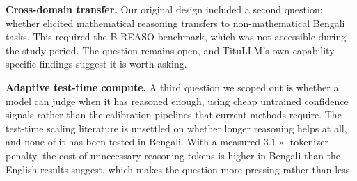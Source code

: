 \textbf{Cross-domain transfer.} Our original design included a second question:
whether elicited mathematical reasoning transfers to non-mathematical Bengali
tasks. This required the B-REASO benchmark, which was not accessible during the
study period. The question remains open, and TituLLM's own capability-specific
findings \parencite{nahin2025titullm} suggest it is worth asking.

\textbf{Adaptive test-time compute.} A third question we scoped out is whether a
model can judge when it has reasoned enough, using cheap untrained confidence
signals rather than the calibration pipelines that current methods require. The
test-time scaling literature is unsettled on whether longer reasoning helps at
all, and none of it has been tested in Bengali. With a measured $3.1\times$
tokenizer penalty, the cost of unnecessary reasoning tokens is higher in Bengali
than the English results suggest, which makes the question more pressing rather
than less.
